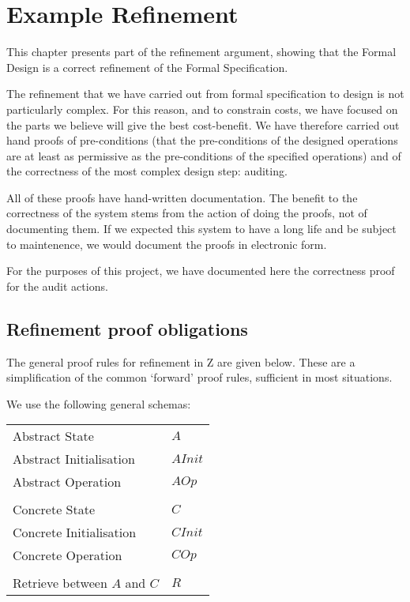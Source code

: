 \chapter{Example Refinement}
\label{chap:refine}
\def\The{the~}%
This chapter presents part of the refinement argument,
showing that the Formal Design  is a correct refinement of the Formal Specification.

The refinement that we have carried out from formal specification to design
is not particularly complex.
For this reason, and to constrain costs, we have focused on the parts we believe will give
the best cost-benefit. We have therefore carried out hand proofs of pre-conditions
(that the pre-conditions of the designed operations are at least as permissive as the
pre-conditions of the specified operations)
and of the correctness of the most complex design step:
auditing.

All of these proofs have hand-written documentation.
The benefit to the correctness of the system stems from the action of doing
the proofs, not of documenting them.
If we expected this system to have a long life and be subject to maintenence,
we would document the proofs in electronic form.

For the purposes of this project,
we have documented here the correctness proof for the audit actions.

\section{Refinement proof obligations}
\label{refine:ProofOb}
The general proof rules for refinement in Z are given below.
These are a simplification of the common `forward' proof rules, sufficient in most situations.

We use the following general schemas:

\begin{tabular}{ll}
  Abstract State			&	$A$
\\Abstract Initialisation	&	$AInit$
\\Abstract Operation		&	$AOp$
\\
\\Concrete State			&	$C$
\\Concrete Initialisation	&	$CInit$
\\Concrete Operation		&	$COp$
\\
\\Retrieve between $A$ and $C$	&	$R$
\end{tabular}

